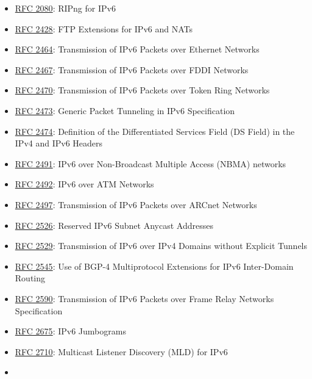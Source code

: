 \documentclass[
]{article}
\providecommand{\tightlist}{%
  \setlength{\itemsep}{0pt}\setlength{\parskip}{0pt}}
\begin{document}
\begin{itemize}
\tightlist
\item
  \href{https://www.rfc-editor.org/info/rfc2080}{RFC 2080}: RIPng for
  IPv6
\item
  \href{https://www.rfc-editor.org/info/rfc2428}{RFC 2428}: FTP
  Extensions for IPv6 and NATs
\item
  \href{https://www.rfc-editor.org/info/rfc2464}{RFC 2464}: Transmission
  of IPv6 Packets over Ethernet Networks
\item
  \href{https://www.rfc-editor.org/info/rfc2467}{RFC 2467}: Transmission
  of IPv6 Packets over FDDI Networks
\item
  \href{https://www.rfc-editor.org/info/rfc2470}{RFC 2470}: Transmission
  of IPv6 Packets over Token Ring Networks
\item
  \href{https://www.rfc-editor.org/info/rfc2473}{RFC 2473}: Generic
  Packet Tunneling in IPv6 Specification
\item
  \href{https://www.rfc-editor.org/info/rfc2474}{RFC 2474}: Definition
  of the Differentiated Services Field (DS Field) in the IPv4 and IPv6
  Headers
\item
  \href{https://www.rfc-editor.org/info/rfc2491}{RFC 2491}: IPv6 over
  Non-Broadcast Multiple Access (NBMA) networks
\item
  \href{https://www.rfc-editor.org/info/rfc2492}{RFC 2492}: IPv6 over
  ATM Networks
\item
  \href{https://www.rfc-editor.org/info/rfc2497}{RFC 2497}: Transmission
  of IPv6 Packets over ARCnet Networks
\item
  \href{https://www.rfc-editor.org/info/rfc2526}{RFC 2526}: Reserved
  IPv6 Subnet Anycast Addresses
\item
  \href{https://www.rfc-editor.org/info/rfc2529}{RFC 2529}: Transmission
  of IPv6 over IPv4 Domains without Explicit Tunnels
\item
  \href{https://www.rfc-editor.org/info/rfc2545}{RFC 2545}: Use of BGP-4
  Multiprotocol Extensions for IPv6 Inter-Domain Routing
\item
  \href{https://www.rfc-editor.org/info/rfc2590}{RFC 2590}: Transmission
  of IPv6 Packets over Frame Relay Networks Specification
\item
  \href{https://www.rfc-editor.org/info/rfc2675}{RFC 2675}: IPv6
  Jumbograms
\item
  \href{https://www.rfc-editor.org/info/rfc2710}{RFC 2710}: Multicast
  Listener Discovery (MLD) for IPv6
\item

\end{itemize}
\end{document}
